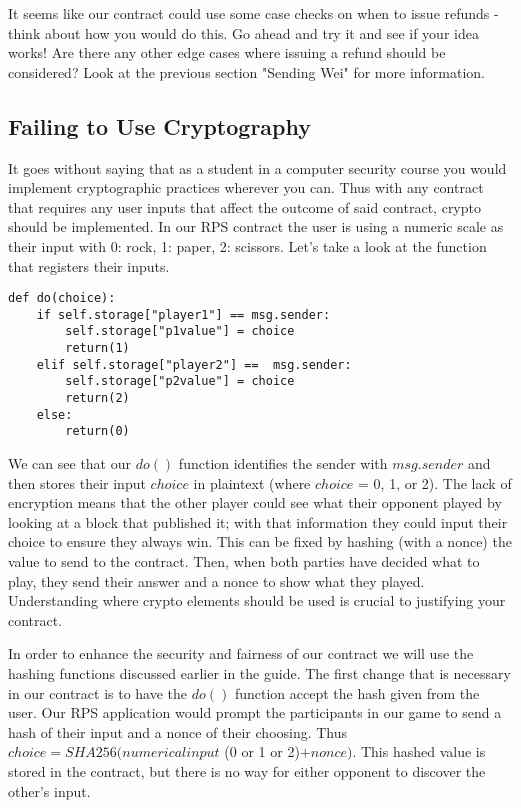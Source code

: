 \documentclass[12pt]{article}
\begin{document}
It seems like our contract could use some case checks on when to issue refunds - think about how you would do this. Go ahead and try it and see if your idea works! Are there any other edge cases where issuing a refund should be considered? Look at the previous section "Sending Wei" for more information. 

\subsection{Failing to Use Cryptography}
It goes without saying that as a student in a computer security course you would implement cryptographic practices wherever you can. Thus with any contract that requires any user inputs that affect the outcome of said contract, crypto should be implemented. In our RPS contract the user is using a numeric scale as their input with 0: rock, 1: paper, 2: scissors. Let's take a look at the function that registers their inputs.

\begin{lstlisting}[frame=single]
def do(choice):
	if self.storage["player1"] == msg.sender:
		self.storage["p1value"] = choice
		return(1)
	elif self.storage["player2"] ==  msg.sender:
		self.storage["p2value"] = choice
		return(2)
	else:
		return(0)
\end{lstlisting}

We can see that our $do()$ function identifies the sender with $msg.sender$ and then stores their input $choice$ in plaintext (where $choice$ = 0, 1, or 2). The lack of encryption means that the other player could see what their opponent played by looking at a block that published it; with that information they could input their choice to ensure they always win. This can be fixed by hashing (with a nonce) the value to send to the contract. Then, when both parties have decided what to play, they send their answer and a nonce to show what they played. Understanding where crypto elements should be used is crucial to justifying your contract. 

In order to enhance the security and fairness of our contract we will use the hashing functions discussed earlier in the guide. The first change that is necessary in our contract is to have the $do()$ function accept the hash given from the user. Our RPS application would prompt the participants in our game to send a hash of their input and a nonce of their choosing. Thus $choice = SHA256(numerical input$ (0 or 1 or 2)$ + nonce)$. This hashed value is stored in the contract, but there is no way for either opponent to discover the other's input.\\
\end{document}
